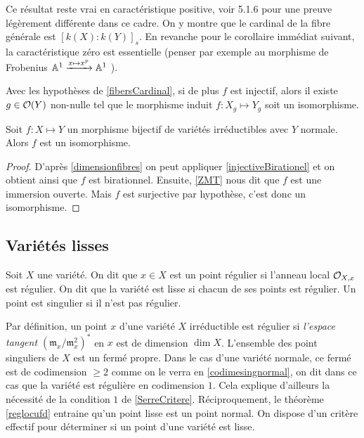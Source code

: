 Ce résultat reste vrai en caractéristique positive, voir \cite{LAGSpringer} 5.1.6 pour une preuve légèrement différente dans ce cadre. On y montre que le cardinal de la fibre générale est $[k(X):k(Y)]_s$. En revanche pour le corollaire immédiat suivant, la caractéristique zéro est essentielle (penser par exemple au morphisme de Frobenius $\mathbb{A}^1 \xrightarrow{x \mapsto x^p} \mathbb{A}^1$ ). 

\begin{cor}\label{injectiveBirationel}
Avec les hypothèses de \ref{fibersCardinal}, si de plus $f$ est injectif, alors il existe $g\in \mathcal{O}(Y)$ non-nulle tel que le morphisme induit $f:X_g \mapsto Y_g$ soit un isomorphisme.
\end{cor}

\begin{thm}\label{ZMTCor}
Soit $f:X \mapsto Y$ un morphisme bijectif de variétés irréductibles avec $Y$ normale. Alors $f$ est un isomorphisme.
\end{thm}
\begin{proof}
D'après \ref{dimensionfibres} on peut appliquer \ref{injectiveBirationel} et on obtient ainsi que $f$ est birationnel. Ensuite, \ref{ZMT} nous dit que $f$ est une immersion ouverte. Mais $f$ est surjective par hypothèse, c'est donc un isomorphisme.
\end{proof}

\subsection{Variétés lisses}

\begin{defn}
Soit $X$ une variété. On dit que $x\in X$ est un point régulier si l'anneau local $\mathcal{O}_{X,x}$ est régulier. On dit que la variété est lisse si chacun de ses points est régulier. Un point est singulier si il n'est pas régulier.
\end{defn}

Par définition, un point $x$ d'une variété $X$ irréductible est régulier si \textit{l'espace tangent $(\mathfrak{m}_x/\mathfrak{m}_x^2)^*$} en $x$ est de dimension $\dim X$. L'ensemble des point singuliers de $X$ est un fermé propre. Dans le cas d'une variété normale, ce fermé est de codimension $\geq 2$ comme on le verra en \ref{codimesingnormal}, on dit dans ce cas que la variété est régulière en codimension $1$. Cela explique d'ailleurs la nécessité de la condition $1$ de \ref{SerreCritere}. Réciproquement, le théorème \ref{reglocufd} entraine qu'un point lisse est un point normal. On dispose d'un critère effectif pour déterminer si un point d'une variété est lisse.

